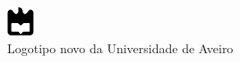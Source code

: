 \begin{figure}[h]
 \center %
 \includegraphics[height=24pt]{latex-intro/ua}
 \caption{Logotipo novo da Universidade de Aveiro}
 \label{fig:ualogo.1}
\end{figure}

